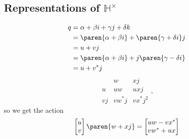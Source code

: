 \documentclass[draft]{scrartcl}
\newcommand{\ham}{\mathbb H}
\begin{document}
\begin{multicols*}{2}

  \section{Representations of \(\ham^\times\)}
  \begin{align*}
    q &= \alpha + \beta i + \gamma j + \delta k \\
      &= \paren{\alpha +\beta i} + \paren{\gamma +\delta i}j  \\
      &= u  + vj  \\
      &=\paren{\alpha+\beta i} + j\paren{\gamma - \delta i} \\
      &= u + v^*j
  \end{align*}
  \[
    \begin{array}{ccc}
      & w& xj \\
      u&uw & uxj    \\
      vj& vw^*j & vx^*j^2
    \end{array},
  \]
  so we get the action
  \begin{align*}
    \begin{bmatrix}
      u \\ v
    \end{bmatrix}
    \paren{w+xj} &=
    \begin{bmatrix}
      uw - vx^* \\ vw^* +ux
    \end{bmatrix} \\

\end{align*}
\end{multicols*}
\end{document}
